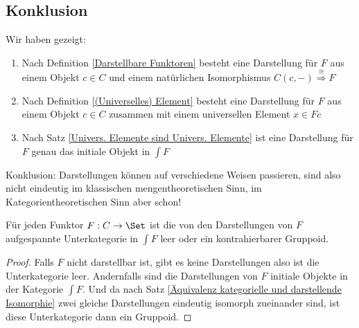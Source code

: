 \documentclass[11pt]{article}
\begin{document}
\subsection{Konklusion}
\begin{note} Wir haben gezeigt:
\begin{enumerate}
    \item Nach Definition \ref{Darstellbare Funktoren} besteht eine Darstellung für $F$ aus einem Objekt $c\in C$ und einem natürlichen Isomorphismus $C(c,-) \overset \cong \Longrightarrow F$
    \item Nach Definition \ref{(Universelles) Element} besteht eine Darstellung für $F$ aus einem Objekt $c\in C$ zusammen mit einem universellen Element $x\in Fc$
    \item Nach Satz \ref{Univers. Elemente sind Univers. Elemente} ist eine Darstellung für $F$ genau das initiale Objekt in $\int F$
\end{enumerate}
Konklusion: Darstellungen können auf verschiedene Weisen passieren, sind also nicht eindeutig im klassischen mengentheoretischen Sinn, im Kategorientheoretischen Sinn aber schon!
\end{note}


\begin{corollary}

 Für jeden Funktor $F: C \to \Set$ ist die von den Darstellungen von $F$ aufgespannte Unterkategorie in $\int F$ 
leer oder ein kontrahierbarer Gruppoid.
    
\end{corollary}

\begin{proof} Falls $F$ nicht darstellbar ist, gibt es keine Darstellungen also ist die Unterkategorie leer. Andernfalls sind die Darstellungen von $F$ initiale Objekte in der Kategorie $\int F$. Und da nach Satz \ref{Äquivalenz kategorielle und darstellende Isomorphie} zwei gleiche Darstellungen eindeutig isomorph zueinander sind, ist diese Unterkategorie dann ein Gruppoid.
\end{proof}
\end{document}
